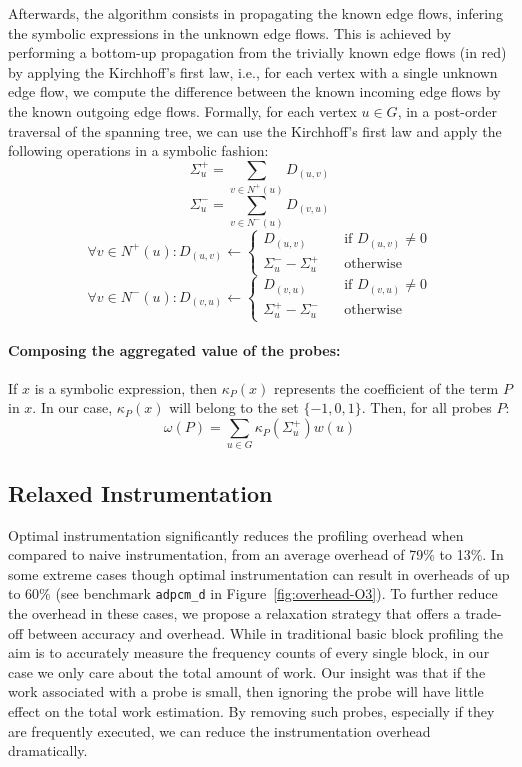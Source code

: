 Afterwards, the algorithm consists in propagating the known edge flows, infering
the symbolic expressions in the unknown edge flows.
This is achieved by performing a bottom-up propagation from the trivially known
edge flows (in red) by applying the Kirchhoff's first law, i.e.,
for each vertex with a single unknown edge flow, we compute the difference between
the known incoming edge flows by the known outgoing edge flows.
Formally,
for each vertex $u\in G$, in a post-order traversal of the spanning tree,
we can use the Kirchhoff's first law and apply the following operations
in a symbolic fashion:
\[
\Sigma^+_u = \sum_{v\in N^+(u)} D_{(u,v)}
\]
\[
\Sigma^-_u = \sum_{v\in N^-(u)} D_{(v,u)}
\]
\[
\forall v\in N^+(u):  D_{(u,v)} \gets
\begin{cases}
    D_{(u,v)} & \quad \text{if $D_{(u,v)}\neq 0$}\\
    \Sigma^-_u - \Sigma^+_u       & \quad \text{otherwise}
\end{cases}
\]
\[
\forall v\in N^-(u):  D_{(v,u)} \gets
\begin{cases}
    D_{(v,u)} & \quad \text{if $D_{(v,u)}\neq 0$}\\
    \Sigma^+_u - \Sigma^-_u       & \quad \text{otherwise}
\end{cases}
\]

\paragraph{Composing the aggregated value of the probes:}
If $x$ is a symbolic expression, then $\kappa_P(x)$ represents the coefficient
of the term $P$ in $x$.
In our case, $\kappa_P(x)$ will belong to the set $\{-1,0,1\}$.
Then, for all probes $P$:
\[
\omega(P) = \sum_{u\in G} \kappa_P(\Sigma^+_u)w(u)
\]

\subsection{Relaxed Instrumentation}

Optimal instrumentation significantly reduces the profiling overhead when compared to naive instrumentation, from an average overhead of
79\% to 13\%. In some extreme cases though optimal instrumentation can result in overheads of up to 60\% (see benchmark \texttt{adpcm\_d}
in Figure~\ref{fig:overhead-O3}). To further reduce the overhead in these cases, we propose a relaxation strategy that offers a trade-off
between accuracy and overhead. While in traditional basic block profiling the aim is to accurately measure the frequency counts of every
single block, in our case we only care about the total amount of work. Our insight was that if the work associated with a probe is small,
then ignoring the probe will have little effect on the total work estimation. By removing such probes, especially if they are frequently
executed, we can reduce the instrumentation overhead dramatically.


